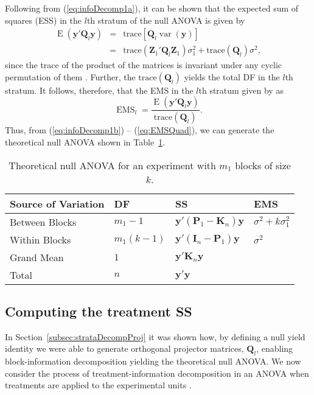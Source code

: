 \documentclass[article]{jss}
\newcommand{\mP}{\mathbf{P}}
\newcommand{\I}{\mathbf{I}}
\newcommand{\K}{\mathbf{K}}
\newcommand{\Z}{\mathbf{Z}}
\newcommand{\Q}{\mathbf{Q}}
\begin{document}
Following from (\ref{eq:infoDecomp1a}), it can be shown that the expected sum of squares (ESS) in the $l$th stratum of the null ANOVA is given by
\begin{eqnarray}
\nonumber \operatorname{E}(\bm{y}'\Q_l\bm{y})&=& \mathrm{trace}\left[\Q_l\operatorname{var}(\bm{y})\right] \\ 
 &=& \mathrm{trace}(\Z_1'\Q_l\Z_1) \sigma^2_1  + \mathrm{trace}(\Q_l) \sigma^2,  \label{eq:ESSQuad}
\end{eqnarray}
since the trace of the product of the matrices is invariant under any cyclic permutation of them \citep{Searle1982}. Further, the $ \mathrm{trace}(\Q_l)$ yields the total DF in the $l$th stratum. It follows, therefore, that the EMS in the $l$th stratum given by as 
\begin{equation}\label{eq:EMSQuad}
\operatorname{EMS}_l=\frac{\operatorname{E}(\bm{y}'\Q_l\bm{y})}{ \mathrm{trace}(\Q_l)}.
\end{equation}
Thus, from (\ref{eq:infoDecomp1b}) -- (\ref{eq:EMSQuad}), we can generate  the theoretical null ANOVA shown in Table~\ref{tab:infoDecomp}. 

\begin{table}[ht]
\centering
\caption{Theoretical null ANOVA	for an experiment with $m_1$ blocks of size $k$.}
\begin{tabular}[t]{llll}
\toprule
 \multicolumn{1}{l}{\bf Source of Variation}&  \multicolumn{1}{l}{\bf DF} & \multicolumn{1}{l}{\bf SS} & \multicolumn{1}{l}{\bf EMS}\\
\midrule
Between Blocks 	 &$m_1-1$ & $\bm{y}'(\mP_{1}-\K_n)\bm{y}$	& $\sigma^2 + k\sigma_{1}^2$\\
Within Blocks 	&$m_1(k - 1)$ & $\bm{y}'(\I_n - \mP_{1})\bm{y}$  & $\sigma^2$\\
\hline
Grand Mean	& $1$ & $\bm{y}'\K_n\bm{y}$ \\
\midrule
Total 	& $n$ & $\bm{y}'\bm{y}$ \\
\bottomrule
\end{tabular}
\label{tab:infoDecomp}
\end{table}

\subsection{Computing the treatment SS}
\label{subsec:estTrt}
In Section~\ref{subsec:strataDecompProj} it was shown how, by defining a null yield identity we were able to generate orthogonal projector matrices, $\Q_{l}$, enabling block-information decomposition yielding the theoretical null ANOVA. We now consider the process of treatment-information decomposition in an ANOVA when treatments are applied to the experimental units \citep{Nelder1965B}. 
\end{document}
